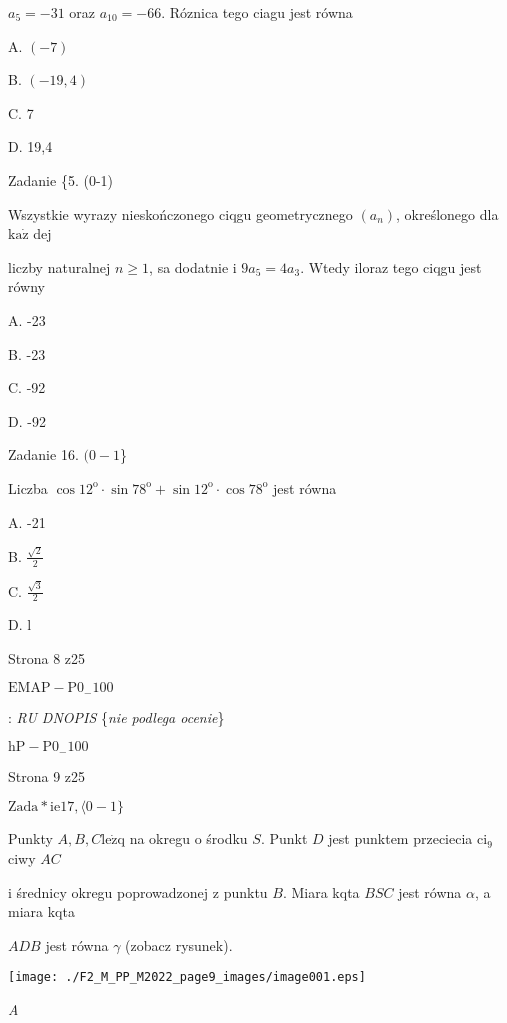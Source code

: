 \documentclass[a4paper,12pt]{article}
\begin{document}
$a_{5}=-31$ oraz $a_{10}=-66$. Róznica tego ciagu jest równa

A. $(-7)$

B. $(-19,4)$

C. 7

D. 19,4

Zadanie \{5. (0-1)

Wszystkie wyrazy nieskończonego ciqgu geometrycznego $(a_{n})$, określonego dla $\mathrm{k}\mathrm{a}\dot{\mathrm{z}}$ dej

liczby naturalnej $n\geq 1$, sa dodatnie i $9a_{5}=4a_{3}$. Wtedy iloraz tego ciqgu jest równy

A. -23

B. -23

C. -92

D. -92

Zadanie 16. $(0-1$\}

Liczba $\cos 12^{\mathrm{o}}\cdot\sin 78^{\mathrm{o}}+\sin 12^{\mathrm{o}}\cdot\cos 78^{\mathrm{o}}$ jest równa

A. -21

B. $\displaystyle \frac{\sqrt{2}}{2}$

C. $\displaystyle \frac{\sqrt{3}}{2}$

D. l

Strona 8 z25

$\mathrm{E}\mathrm{M}\mathrm{A}\mathrm{P}-\mathrm{P}0_{-}100$





: {\it RU DNOPIS} \{{\it nie podlega ocenie}\}

$\mathrm{h}\mathrm{P}-\mathrm{P}0_{-}100$

Strona 9 z25





$\mathrm{Z}\mathrm{a}\mathrm{d}\mathrm{a}*\mathrm{i}\mathrm{e}17, \langle 0-1\}$

Punkty $A, B, C \mathrm{l}\mathrm{e}\dot{\mathrm{z}}\mathrm{q}$ na okregu o środku $S$. Punkt $D$ jest punktem przeciecia $\mathrm{c}\mathrm{i}_{9}$ciwy $AC$

i średnicy okregu poprowadzonej z punktu $B$. Miara kqta $BSC$ jest równa $\alpha$, a miara kqta

$ADB$ jest równa $\gamma$ (zobacz rysunek).
\begin{center}
\texttt{[image: ./F2\_M\_PP\_M2022\_page9\_images/image001.eps]}
\end{center}
{\it A}
\end{document}
